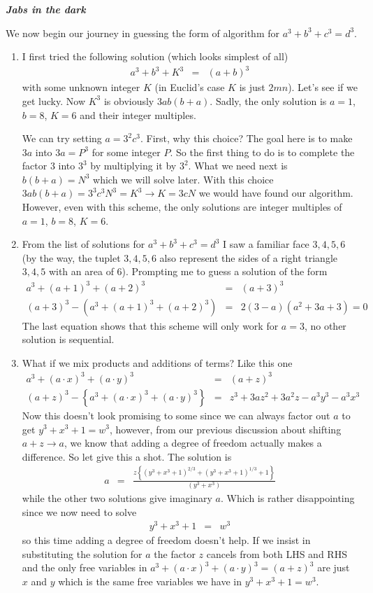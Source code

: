 \documentclass[aps,preprint,preprintnumbers,nofootinbib,showpacs,prd]{revtex4-1}
\newcommand{\nbea}{\begin{eqnarray*}}
\newcommand{\neea}{\end{eqnarray*}}
\begin{document}
\bigskip\textbf{\textit{Jabs in the dark}}

We now begin our journey in guessing the form of algorithm for $a^3 + b^3 + c^3 = d^3$.
\begin{enumerate}
\item I first tried the following solution (which looks simplest of all)
%
\nbea
a^3 + b^3 + K^3  & = & (a + b)^3
\neea
%
with some unknown integer $K$ (in Euclid's case $K$ is just $2mn$). Let's see if we get lucky. Now $K^3$ is obviously $3 a b (b + a)$. Sadly, the only solution is $a = 1$, $b = 8$, $K=6$ and their integer multiples. 

We can try setting $a = 3^2 c^3$. First, why this choice? The goal here is to make $3a$ into $3a=P^3$ for some integer $P$. So the first thing to do is to complete the factor 3 into $3^3$ by multiplying it by $3^2$. What we need next is $b (b + a) = N^3$ which we will solve later. With this choice $3 a b (b + a) = 3^3 c^3 N^3 = K^3 \rightarrow K = 3 c N$ we would have found our algorithm. However, even with this scheme, the only solutions are integer multiples of $a = 1$, $b = 8$, $K=6$.

\item From the list of solutions for $a^3 + b^3 + c^3 = d^3$ I saw a familiar face $3, 4, 5, 6$ (by the way, the tuplet $3,4,5,6$ also represent the sides of a right triangle $3,4,5$ with an area of $6$). Prompting me to guess a solution of the form
%
\nbea
a^3 + (a+1)^3 + (a+2)^3  & = & (a + 3)^3 \\
(a + 3)^3 - (a^3 + (a+1)^3 + (a+2)^3) & = & 2 (3 - a) (a^2 + 3a + 3) = 0
\neea
%
The last equation shows that this scheme will only work for $a = 3$, no other solution is sequential.

\item What if we mix products and additions of terms? Like this one
%
\nbea
a^3 + (a \cdot x)^3 + (a \cdot y)^3 & = & (a + z)^3 \\
(a + z)^3 - \left \{ a^3 + (a \cdot x)^3 + (a \cdot y)^3 \right \} & = & z^3 + 3 a z^2 + 3 a^2 z - a^3 y^3 - a^3 x^3
\neea
%
Now this doesn't look promising to some since we can always factor out $a$ to get $y^3 + x^3 + 1 = w^3$, however, from our previous discussion about shifting $a + z \to a$, we know that adding a degree of freedom actually makes a difference. So let give this a shot. The solution is
%
\nbea
a & = & \frac{z \left \{ (y^3 + x^3 + 1)^{2/3} + (y^3 + x^3 + 1)^{1/3} +1 \right \} }{(y^3 + x^3) }
\neea
%
while the other two solutions give imaginary $a$. Which is rather disappointing since we now need to solve
%
\nbea
y^3 + x^3 + 1 & = & w^3
\neea
%
so this time adding a degree of freedom doesn't help. If we insist in substituting the solution for $a$ the factor $z$ cancels from both LHS and RHS and the only free variables in $a^3 + (a \cdot x)^3 + (a \cdot y)^3 = (a + z)^3$ are just $x$ and $y$ which is the same free variables we have in $y^3 + x^3 + 1 = w^3$.


\end{enumerate}
\end{document}
